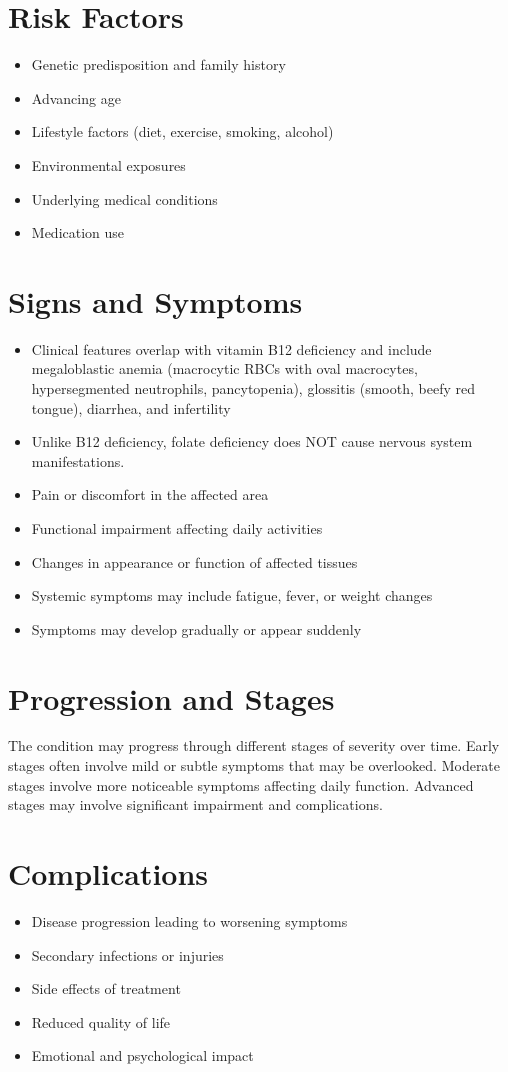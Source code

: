 \section{Risk Factors}
\begin{itemize}[noitemsep]
  \item Genetic predisposition and family history
  \item Advancing age
  \item Lifestyle factors (diet, exercise, smoking, alcohol)
  \item Environmental exposures
  \item Underlying medical conditions
  \item Medication use
\end{itemize}
\section{Signs and Symptoms}
\begin{itemize}[noitemsep]
  \item Clinical features overlap with vitamin B12 deficiency and include megaloblastic anemia (macrocytic RBCs with oval macrocytes, hypersegmented neutrophils, pancytopenia), glossitis (smooth, beefy red tongue), diarrhea, and infertility
  \item Unlike B12 deficiency, folate deficiency does NOT cause nervous system manifestations.
  \item Pain or discomfort in the affected area
  \item Functional impairment affecting daily activities
  \item Changes in appearance or function of affected tissues
  \item Systemic symptoms may include fatigue, fever, or weight changes
  \item Symptoms may develop gradually or appear suddenly
\end{itemize}
\section{Progression and Stages}
The condition may progress through different stages of severity over time. Early stages often involve mild or subtle symptoms that may be overlooked. Moderate stages involve more noticeable symptoms affecting daily function. Advanced stages may involve significant impairment and complications.
\section{Complications}
\begin{itemize}[noitemsep]
  \item Disease progression leading to worsening symptoms
  \item Secondary infections or injuries
  \item Side effects of treatment
  \item Reduced quality of life
  \item Emotional and psychological impact
\end{itemize}
